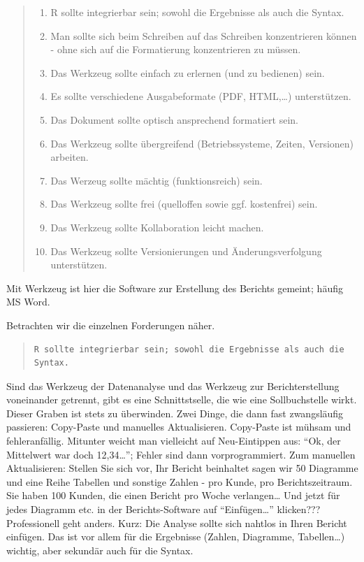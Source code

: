 \documentclass[12pt,]{book}
\providecommand{\tightlist}{%
  \setlength{\itemsep}{0pt}\setlength{\parskip}{0pt}}
\begin{document}
\begin{quote}
\begin{enumerate}
\def\labelenumi{\arabic{enumi}.}
\tightlist
\item
  R sollte integrierbar sein; sowohl die Ergebnisse als auch die Syntax.
\item
  Man sollte sich beim Schreiben auf das Schreiben konzentrieren können
  - ohne sich auf die Formatierung konzentrieren zu müssen.
\item
  Das Werkzeug sollte einfach zu erlernen (und zu bedienen) sein.
\item
  Es sollte verschiedene Ausgabeformate (PDF, HTML,\ldots{})
  unterstützen.
\item
  Das Dokument sollte optisch ansprechend formatiert sein.
\item
  Das Werkzeug sollte übergreifend (Betriebssysteme, Zeiten, Versionen)
  arbeiten.
\item
  Das Werzeug sollte mächtig (funktionsreich) sein.
\item
  Das Werkzeug sollte frei (quelloffen sowie ggf. kostenfrei) sein.
\item
  Das Werkzeug sollte Kollaboration leicht machen.
\item
  Das Werkzeug sollte Versionierungen und Änderungsverfolgung
  unterstützen.
\end{enumerate}
\end{quote}

Mit Werkzeug ist hier die Software zur Erstellung des Berichts gemeint;
häufig MS Word.

Betrachten wir die einzelnen Forderungen näher.

\begin{quote}
\begin{verbatim}
R sollte integrierbar sein; sowohl die Ergebnisse als auch die Syntax.
\end{verbatim}
\end{quote}

Sind das Werkzeug der Datenanalyse und das Werkzeug zur
Berichterstellung voneinander getrennt, gibt es eine Schnittstselle, die
wie eine Sollbuchstelle wirkt. Dieser Graben ist stets zu überwinden.
Zwei Dinge, die dann fast zwangsläufig passieren: Copy-Paste und
manuelles Aktualisieren. Copy-Paste ist mühsam und fehleranfällig.
Mitunter weicht man vielleicht auf Neu-Eintippen aus: ``Ok, der
Mittelwert war doch 12,34\ldots{}''; Fehler sind dann vorprogrammiert.
Zum manuellen Aktualisieren: Stellen Sie sich vor, Ihr Bericht
beinhaltet sagen wir 50 Diagramme und eine Reihe Tabellen und sonstige
Zahlen - pro Kunde, pro Berichtszeitraum. Sie haben 100 Kunden, die
einen Bericht pro Woche verlangen\ldots{} Und jetzt für jedes Diagramm
etc. in der Berichts-Software auf ``Einfügen\ldots{}'' klicken???
Professionell geht anders. Kurz: Die Analyse sollte sich nahtlos in
Ihren Bericht einfügen. Das ist vor allem für die Ergebnisse (Zahlen,
Diagramme, Tabellen\ldots{}) wichtig, aber sekundär auch für die Syntax.
\end{document}
